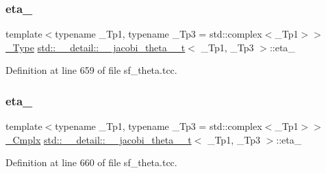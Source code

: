 \subsubsection{\texorpdfstring{eta\+\_}{eta\_1}}
{\footnotesize\ttfamily template$<$typename \+\_\+\+Tp1, typename \+\_\+\+Tp3 = std\+::complex$<$\+\_\+\+Tp1$>$$>$ \\
\hyperlink{structstd_1_1____detail_1_1____jacobi__theta__0__t_a4aebcbdd8f3ab416a2fa770aa3784d63}{\+\_\+\+Type} \hyperlink{structstd_1_1____detail_1_1____jacobi__theta__0__t}{std\+::\+\_\+\+\_\+detail\+::\+\_\+\+\_\+jacobi\+\_\+theta\+\_\+\_\+t}$<$ \+\_\+\+Tp1, \+\_\+\+Tp3 $>$\+::eta\+\_}



Definition at line 659 of file sf\+\_\+theta.\+tcc.

\mbox{\label{structstd_1_1____detail_1_1____jacobi__theta__0__t_a51f352f17b7ac03bc49555c50cb868fd}} 
\subsubsection{\texorpdfstring{eta\+\_}{eta\_2}}
{\footnotesize\ttfamily template$<$typename \+\_\+\+Tp1, typename \+\_\+\+Tp3 = std\+::complex$<$\+\_\+\+Tp1$>$$>$ \\
\hyperlink{structstd_1_1____detail_1_1____jacobi__theta__0__t_abe1df2c4f893fbb7c6fad023115f2fd6}{\+\_\+\+Cmplx} \hyperlink{structstd_1_1____detail_1_1____jacobi__theta__0__t}{std\+::\+\_\+\+\_\+detail\+::\+\_\+\+\_\+jacobi\+\_\+theta\+\_\+\_\+t}$<$ \+\_\+\+Tp1, \+\_\+\+Tp3 $>$\+::eta\+\_}



Definition at line 660 of file sf\+\_\+theta.\+tcc.

\mbox{\label{structstd_1_1____detail_1_1____jacobi__theta__0__t_a5b78b926a66c08ad2067f21aa5264a39}} 
